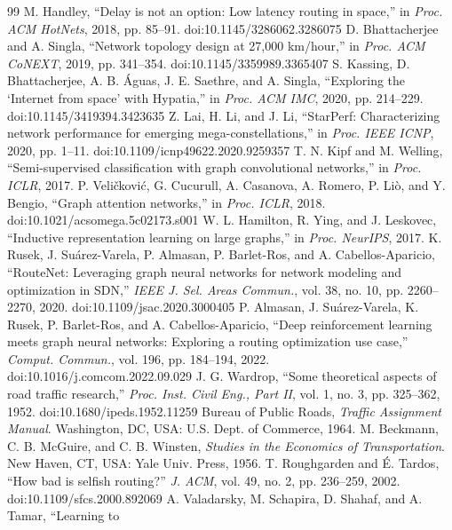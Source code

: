 \documentclass[journal]{IEEEtran}
\begin{document}
\begin{thebibliography}{99}
 M. Handley, ``Delay is not an option: Low latency routing in
space,'' in \emph{Proc. ACM HotNets}, 2018, pp. 85--91. doi:10.1145/3286062.3286075
 D. Bhattacherjee and A. Singla, ``Network topology
design at 27,000 km/hour,'' in \emph{Proc. ACM CoNEXT}, 2019, pp. 341--354. doi:10.1145/3359989.3365407
 S. Kassing, D. Bhattacherjee, A. B. Águas, J. E. Saethre, and
A. Singla, ``Exploring the `Internet from space' with Hypatia,'' in \emph{Proc. ACM
IMC}, 2020, pp. 214--229. doi:10.1145/3419394.3423635
 Z. Lai, H. Li, and J. Li, ``StarPerf: Characterizing network
performance for emerging mega-constellations,'' in \emph{Proc. IEEE ICNP}, 2020, pp. 1--11. doi:10.1109/icnp49622.2020.9259357
 T. N. Kipf and M. Welling, ``Semi-supervised classification with graph
convolutional networks,'' in \emph{Proc. ICLR}, 2017.
 P. Veli\v{c}kovi\'c, G. Cucurull, A. Casanova, A. Romero, P. Li\`o, and
Y. Bengio, ``Graph attention networks,'' in \emph{Proc. ICLR}, 2018. doi:10.1021/acsomega.5c02173.s001
 W. L. Hamilton, R. Ying, and J. Leskovec, ``Inductive
representation learning on large graphs,'' in \emph{Proc. NeurIPS}, 2017.
 K. Rusek, J. Su\'arez-Varela, P. Almasan, P. Barlet-Ros, and
A. Cabellos-Aparicio, ``RouteNet: Leveraging graph neural networks for network modeling
and optimization in SDN,'' \emph{IEEE J. Sel. Areas Commun.}, vol. 38, no. 10,
pp. 2260--2270, 2020. doi:10.1109/jsac.2020.3000405
 P. Almasan, J. Su\'arez-Varela, K. Rusek, P. Barlet-Ros, and
A. Cabellos-Aparicio, ``Deep reinforcement learning meets graph neural networks:
Exploring a routing optimization use case,'' \emph{Comput. Commun.}, vol. 196,
pp. 184--194, 2022. doi:10.1016/j.comcom.2022.09.029
 J. G. Wardrop, ``Some theoretical aspects of road traffic research,''
\emph{Proc. Inst. Civil Eng., Part II}, vol. 1, no. 3, pp. 325--362, 1952. doi:10.1680/ipeds.1952.11259
 Bureau of Public Roads, \emph{Traffic Assignment Manual}. Washington, DC,
USA: U.S. Dept. of Commerce, 1964.
 M. Beckmann, C. B. McGuire, and C. B. Winsten, \emph{Studies in the
Economics of Transportation}. New Haven, CT, USA: Yale Univ. Press, 1956.
 T. Roughgarden and \'E. Tardos, ``How bad is selfish routing?''
\emph{J. ACM}, vol. 49, no. 2, pp. 236--259, 2002. doi:10.1109/sfcs.2000.892069
 A. Valadarsky, M. Schapira, D. Shahaf, and A. Tamar, ``Learning to

\end{thebibliography}
\end{document}
